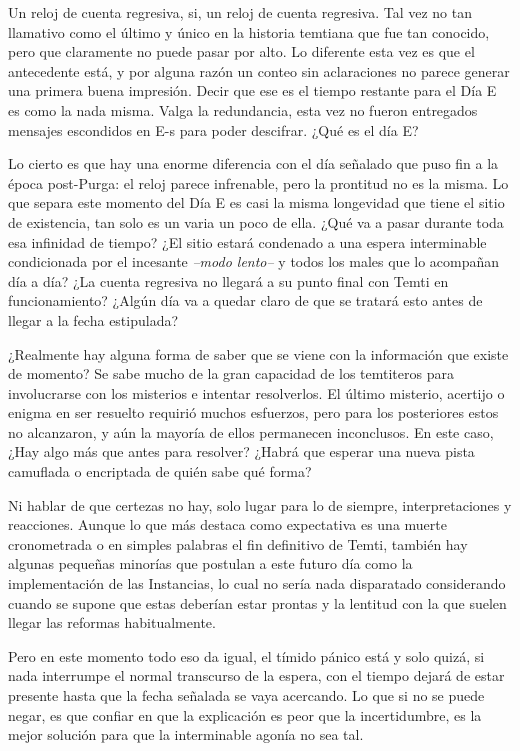\documentclass[
  spanish,
]{book}
\begin{document}
Un reloj de cuenta regresiva, si, un reloj de cuenta regresiva. Tal vez no tan llamativo como el último y único en la historia temtiana que fue tan conocido, pero que claramente no puede pasar por alto. Lo diferente esta vez es que el antecedente está, y por alguna razón un conteo sin aclaraciones no parece generar una primera buena impresión. Decir que ese es el tiempo restante para el Día E es como la nada misma. Valga la redundancia, esta vez no fueron entregados mensajes escondidos en E-s para poder descifrar. ¿Qué es el día E?

Lo cierto es que hay una enorme diferencia con el día señalado que puso fin a la época post-Purga: el reloj parece infrenable, pero la prontitud no es la misma. Lo que separa este momento del Día E es casi la misma longevidad que tiene el sitio de existencia, tan solo es un varia un poco de ella. ¿Qué va a pasar durante toda esa infinidad de tiempo? ¿El sitio estará condenado a una espera interminable condicionada por el incesante \emph{--modo lento--} y todos los males que lo acompañan día a día? ¿La cuenta regresiva no llegará a su punto final con Temti en funcionamiento? ¿Algún día va a quedar claro de que se tratará esto antes de llegar a la fecha estipulada?

¿Realmente hay alguna forma de saber que se viene con la información que existe de momento?
Se sabe mucho de la gran capacidad de los temtiteros para involucrarse con los misterios e intentar resolverlos. El último misterio, acertijo o enigma en ser resuelto requirió muchos esfuerzos, pero para los posteriores estos no alcanzaron, y aún la mayoría de ellos permanecen inconclusos. En este caso, ¿Hay algo más que antes para resolver? ¿Habrá que esperar una nueva pista camuflada o encriptada de quién sabe qué forma?

Ni hablar de que certezas no hay, solo lugar para lo de siempre, interpretaciones y reacciones. Aunque lo que más destaca como expectativa es una muerte cronometrada o en simples palabras el fin definitivo de Temti, también hay algunas pequeñas minorías que postulan a este futuro día como la implementación de las Instancias, lo cual no sería nada disparatado considerando cuando se supone que estas deberían estar prontas y la lentitud con la que suelen llegar las reformas habitualmente.

Pero en este momento todo eso da igual, el tímido pánico está y solo quizá, si nada interrumpe el normal transcurso de la espera, con el tiempo dejará de estar presente hasta que la fecha señalada se vaya acercando. Lo que si no se puede negar, es que confiar en que la explicación es peor que la incertidumbre, es la mejor solución para que la interminable agonía no sea tal.
\end{document}
